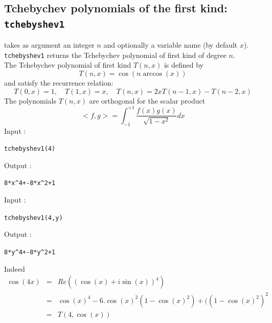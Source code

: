 \documentclass[a4paper,11pt]{book}
\begin{document}
\subsection{Tchebychev polynomials of the first kind: {\tt tchebyshev1}}
 takes as argument an integer $n$ and optionally a 
variable name (by default $x$).\\
{\tt tchebyshev1} returns the Tchebychev polynomial of first kind
of degree $n$.\\
The Tchebychev polynomial of first kind $T(n,x)$ is defined by
\[ T(n,x)= \cos(n \arccos(x)) \]
and satisfy the recurrence relation:
\[ T(0,x)=1, \quad 
T(1,x)=x, \quad T(n,x)=2xT(n-1,x)-T(n-2,x) \]
The polynomials $T(n,x)$  are orthogonal for the scalar product
\[ <f,g>=\int_{-1}^{+1}\frac{f(x)g(x)}{\sqrt{1-x^2}}dx \]
Input :
\begin{center}{\tt tchebyshev1(4)}\end{center}
Output :
\begin{center}{\tt 8*x\verb|^|4+-8*x\verb|^|2+1}\end{center}
Input :
\begin{center}{\tt tchebyshev1(4,y)}\end{center}
Output :
\begin{center}{\tt 8*y\verb|^|4+-8*y\verb|^|2+1}\end{center}
Indeed
\begin{eqnarray*}
\cos( 4 x)&=&Re((\cos(x)+i \sin(x))^4) \\
          &=&\cos(x)^4-6.\cos(x)^2 (1-\cos(x)^2)+((1-\cos(x)^2)^2 \\
          &=&T(4,\cos(x))
\end{eqnarray*}
\end{document}
